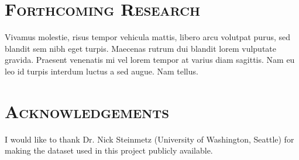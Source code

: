 \documentclass[a0,portrait]{a0poster}
\begin{document}
\begin{multicols}{2}


\section*{\color{NavyBlue}\textsc{Forthcoming Research}\color{Black}}

Vivamus molestie, risus tempor vehicula mattis, libero arcu volutpat purus, sed blandit sem nibh eget turpis. Maecenas rutrum dui blandit lorem vulputate gravida. Praesent venenatis mi vel lorem tempor at varius diam sagittis. Nam eu leo id turpis interdum luctus a sed augue. Nam tellus.


\section*{\color{NavyBlue}\textsc{Acknowledgements}\color{Black}}

I would like to thank Dr. Nick Steinmetz (University of Washington, Seattle) for making the dataset used in this project publicly available.




\end{multicols}
\end{document}
